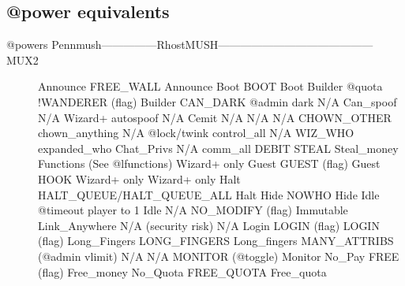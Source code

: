 \documentclass[letterpaper,10pt,english]{sphinxmanual}
\begin{document}
\subsection{@power equivalents}
\label{\detokenize{differences:power-equivalents}}\begin{description}
\item[{@powers Pennmush—————\sphinxhyphen{}RhostMUSH——————————————MUX2}] \leavevmode
\sphinxAtStartPar
Announce                FREE\_WALL                                          Announce
Boot                    BOOT                                               Boot
Builder                 @quota !WANDERER (flag)                            Builder
CAN\_DARK                @admin  dark                   N/A
Can\_spoof               N/A \sphinxhyphen{} Wizard+ auto\sphinxhyphen{}spoof                           N/A
Cemit                   N/A                                                N/A
N/A                     CHOWN\_OTHER                                        chown\_anything
N/A                     @lock/twink                                        control\_all
N/A                     WIZ\_WHO                                            expanded\_who
Chat\_Privs              N/A                                                comm\_all
DEBIT                   STEAL                                              Steal\_money
Functions               (See @lfunctions)                                  Wizard+ only
Guest                   GUEST (flag)                                       Guest
HOOK                    Wizard+ only                                       Wizard+ only
Halt                    HALT\_QUEUE/HALT\_QUEUE\_ALL                          Halt
Hide                    NOWHO                                              Hide
Idle                    @timeout player to \sphinxhyphen{}1                              Idle
N/A                     NO\_MODIFY (flag)                                   Immutable
Link\_Anywhere           N/A (security risk)                                N/A
Login                   LOGIN (flag)                                       LOGIN (flag)
Long\_Fingers            LONG\_FINGERS                                       Long\_fingers
MANY\_ATTRIBS            (@admin vlimit)                                    N/A
N/A                     MONITOR (@toggle)                                  Monitor
No\_Pay                  FREE (flag)                                        Free\_money
No\_Quota                FREE\_QUOTA                                         Free\_quota

\end{description}
\end{document}
